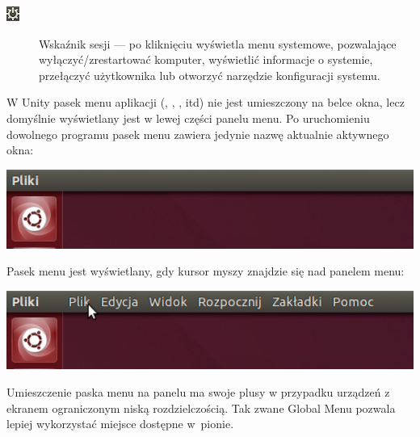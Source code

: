 \begin{description}
\item[\includegraphics{images/unity_wskaznik_system.png}]\textcolor{ubuntu_orange}{Wskaźnik sesji} --- po kliknięciu wyświetla menu systemowe, pozwalające wyłączyć/zrestartować komputer, wyświetlić informacje o systemie, przełączyć użytkownika lub otworzyć narzędzie konfiguracji systemu.
\end{description}

\label{unity_menu_bar}
W Unity pasek menu aplikacji (, , , itd) nie jest umieszczony na belce okna, lecz domyślnie wyświetlany jest w lewej części panelu menu. Po uruchomieniu dowolnego programu pasek menu zawiera jedynie nazwę aktualnie aktywnego okna:

\begin{center}
	\includegraphics[width=\linewidth]{images/unity_menu_bar2.png}
\end{center}

Pasek menu jest wyświetlany, gdy kursor myszy znajdzie się nad panelem menu:

\begin{center}
	\includegraphics[width=\linewidth]{images/unity_menu_bar3.png}
\end{center}

Umieszczenie paska menu na panelu ma swoje plusy w przypadku urządzeń z ekranem ograniczonym niską rozdzielczością. Tak zwane \textcolor{ubuntu_orange}{Global Menu} pozwala lepiej wykorzystać miejsce dostępne w~pionie.
